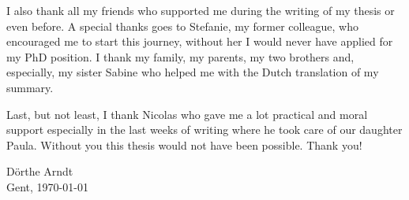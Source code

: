 I also thank all my friends who supported me during the writing of my thesis or even before. 
A special thanks goes to Stefanie, my former colleague, who encouraged me to start this journey, without her I would never have applied for my PhD position.
I thank my family, my parents, my two brothers and, especially, my sister Sabine who helped me with the Dutch translation of my summary.

Last, but not least, I thank Nicolas who gave me a lot practical and moral support especially in the last weeks of writing where he took care of our daughter Paula. 
Without you this thesis would not have been possible.
Thank you!

\vspace*{\fill}

\begin{flushright}
D\"orthe Arndt \\
Gent, \today
\end{flushright}

\vspace*{\fill}



